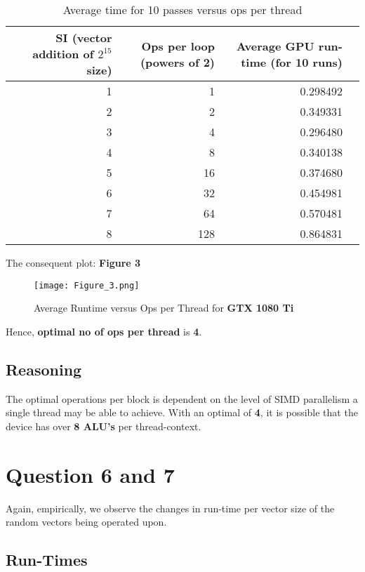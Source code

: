 \begin{table}[ht]
\footnotesize
\centering
\begin{tabular}{r||rrr}
 SI (vector addition of $2^{15}$ size) & Ops per loop (powers of 2) & Average GPU run-time (for 10 runs)  \\ 
 \hline \hline
1 & 1 &  0.298492 \\ 
2& 2  & 0.349331 \\
3& 4 & 0.296480 \\
4& 8 & 0.340138 \\
5& 16 & 0.374680 \\
6 & 32 &0.454981 \\
7 & 64 &0.570481 \\
8 & 128 &0.864831 \\
\end{tabular}
\caption{Average time for 10 passes versus ops per thread}
\end{table}

The consequent plot: \textbf{Figure 3} \\

\begin{figure}[ht]
\centering
\texttt{[image: Figure\_3.png]}
\caption{Average Runtime versus Ops per Thread for \textbf{GTX 1080 Ti}}
\end{figure}

Hence, \textbf{optimal no of ops per thread} is \textbf{4}.\\

\subsection{Reasoning}

The optimal operations per block is dependent on the level of SIMD parallelism a single thread may be able to achieve. With an optimal of \textbf{4}, it is possible that the device has over \textbf{8 ALU's} per thread-context. \\

\section {Question 6 and 7}
Again, empirically, we observe the changes in run-time per vector size of the random vectors being operated upon.
 
 \subsection{Run-Times}
 
